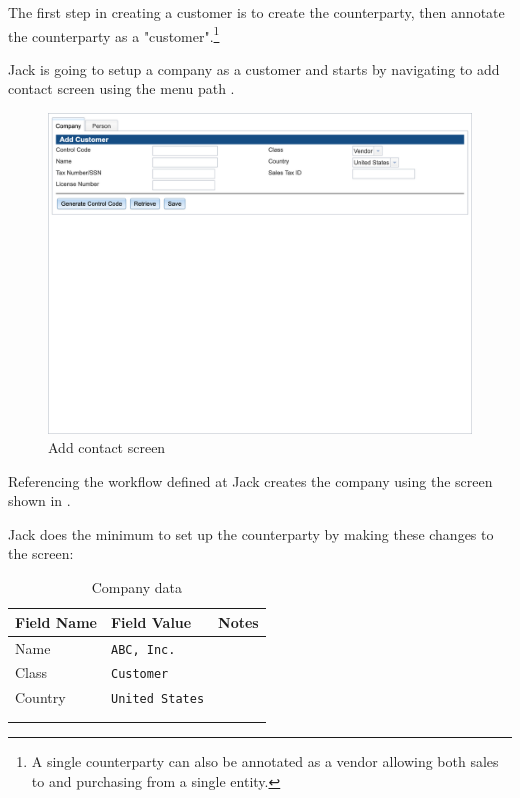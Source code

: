 The first step in creating a customer is to create the \gls{counterparty}, then annotate the \gls{counterparty} as a "customer".\footnote{ A single counterparty can also be annotated as a vendor allowing both sales to and purchasing from a single entity.}

Jack is going to setup a company as a customer and starts by navigating to add contact screen using the menu path . 

\begin{figure}[H]
    \centering
    \includegraphics[width=\linewidth]{auto-screenshots/contacts--add-contact.png}
    \caption{Add contact screen}
    \label{fig:contacts-add-contact-screen}
\end{figure}

Referencing the workflow defined at  Jack creates the company using the
screen shown in . 

Jack does the minimum to set up the  \gls{counterparty} by making these changes to the screen:

\begin{longtable}{ llp{6cm} }
    Field Name & Field Value & Notes \\ \hline
    \endhead
    Name & \texttt{ABC, Inc.} & \\
    Class & \texttt{Customer} & \\
    Country & \texttt{United States} & \\
    & & \\
    \caption{Company data}
    \label{fig:ramping-add-company-data}
\end{longtable}

